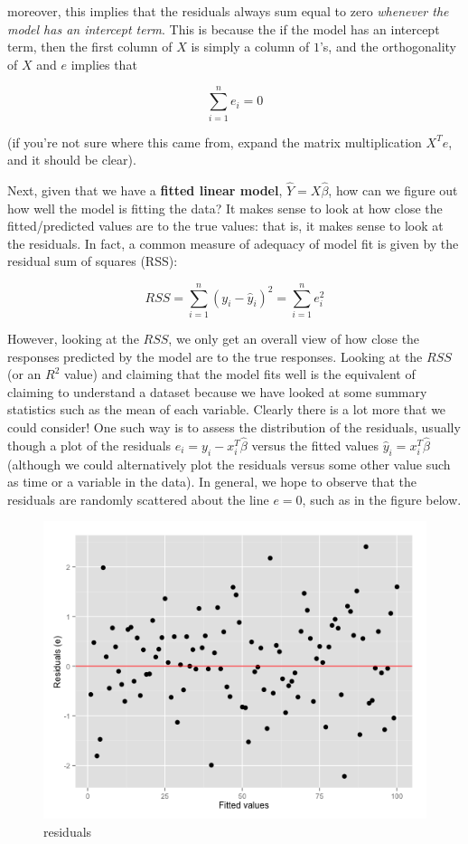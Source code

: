 moreover, this implies that the residuals always sum equal to zero \textit{whenever the model has an intercept term}. This is because the if the model has an intercept term, then the first column of $X$ is simply a column of $1$'s, and the orthogonality of $X$ and $e$ implies that

$$\sum_{i=1}^n e_i = 0$$

(if you're not sure where this came from, expand the matrix multiplication $X^Te$, and it should be clear).


Next, given that we have a {\bf fitted linear model}, $\hat{Y} = X \hat{\beta}$, how can we figure out how well the model is fitting the data? It makes sense to look at how close the fitted/predicted values are to the true values: that is, it makes sense to look at the residuals. In fact, a common measure of adequacy of model fit is given by the residual sum of squares (RSS):

$$RSS = \sum_{i=1}^n (y_i - \hat{y}_i)^2 = \sum_{i=1}^n e_i^2$$


However, looking at the $RSS$, we only get an overall view of how close the responses predicted by the model are to the true responses. Looking at the $RSS$ (or an $R^2$ value) and claiming that the model fits well is the equivalent of claiming to understand a dataset because we have looked at some summary statistics such as the mean of each variable. Clearly there is a lot more that we could consider! One such way is to assess the distribution of the residuals, usually though a plot of the residuals $e_i = y_i - x_i^T \hat{\beta}$ versus the fitted values $\hat{y}_i = x_i^T\hat{\beta}$ (although we could alternatively plot the residuals versus some other value such as time or a variable in the data).  In general, we hope to observe that the residuals are randomly scattered about the line $e = 0$, such as in the figure below.



\begin{figure}[H]
\begin{center}
\includegraphics[scale=0.4]{residuals.png}
\end{center}
\caption{residuals}
\label{fig:residuals}
\end{figure}

